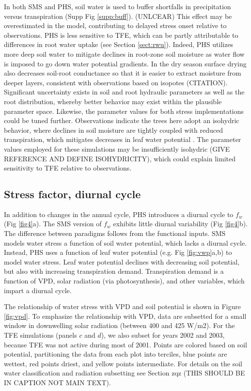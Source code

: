 \documentclass[draft,linenumbers]{agujournal}
\begin{document}
    In both SMS and PHS, soil water is used to buffer shortfalls in precipitation versus transpiration (Supp Fig \ref{supp:buff}). (UNLCEAR)
    This effect may be overestimated in the model, contributing to delayed stress onset relative to observations.
    PHS is less sensitive to TFE, which can be partly attributable to differences in root water uptake (see Section \ref{sect:rwu}). 
    Indeed, PHS utilizes more deep soil water to mitigate declines in root-zone soil moisture as water flow is imposed to go down water potential gradients. In the dry season surface drying also decreases soil-root conductance so that it is easier to extract moisture from deeper layers, consistent with observations based on isopotes (CITATION).
    Significant uncertainty exists in soil and root hydraulic parameters as well as the root distribution, whereby better behavior may exist within the plausible parameter space.
    Likewise, the parameter values for both stress implementations could be tuned further.
    Observations indicate the trees here adopt an isohydric behavior, where declines in soil moisture are tightly coupled with reduced transpiration, which mitigates decreases in leaf water potential \citep{fisher2006}.
    The parameter values employed for these simulations may be insufficiently isohydric (GIVE REFERENCE AND DEFINE ISOHYDRICITY), which could explain limited sensitivity to TFE relative to observations.

\subsection{Stress factor, diurnal cycle}
    
    In addition to changes in the annual cycle, PHS introduces a diurnal cycle to $f_w$ (Fig \ref{fig4}a). 
    The SMS version of $f_w$ exhibits little diurnal variability (Fig \ref{fig4}b).
    The difference between paradigms follows from the functional inputs.
    SMS models water stress a function of soil water potential, which lacks a diurnal cycle.
    Instead, PHS uses a function of leaf water potential (e.g. Fig \ref{fig:vwp}a,b) to model water stress.
    Leaf water potential declines with decreasing soil potential, but also with increasing transpiration demand.
    Transpiration demand is a function of VPD, solar radiation (via photosynthesis), and other variables, which impart a diurnal cycle.
    
    The relationship of water stress with VPD and soil potential is shown in Figure \ref{fig:vpd}. 
    To emphasize the relationship with VPD, data are subsetted for a small window in downwelling solar radiation (between 400 and 425 W/m2).
    For the TFE simulations (panels $c$ and $d$), we also subset for years 2002 and 2003, because TFE was not active during most of 2001.
    Points are colored based on soil potential, partitioning the data from each plot into terciles, blue points are wettest, red points driest, and yellow points intermediate.
    For details on the soil water classification and radiation subsetting see Section zqz (THIS SHOULD BE IN CAPTION NOT MAIN TEXT).
    
\end{document}
